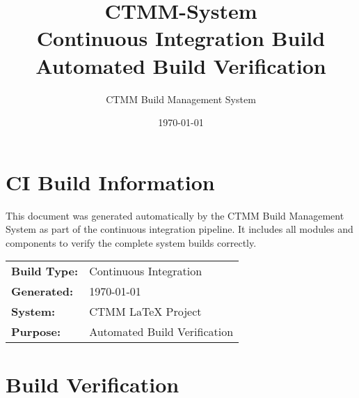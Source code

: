 \documentclass[a4paper,12pt]{article}
\begin{document}
\title{%
  {\Huge\textcolor{ctmmBlue}{CTMM-System}}\\
  \vspace{0.5cm}
  {\Large\textcolor{ctmmOrange}{Continuous Integration Build}}\\
  \vspace{0.3cm}
  {\normalsize Automated Build Verification}
}
\author{CTMM Build Management System}
\date{\today}
\maketitle

\tableofcontents
\newpage

\section{CI Build Information}
\label{sec:ci-info}

This document was generated automatically by the CTMM Build Management System as part of the continuous integration pipeline. It includes all modules and components to verify the complete system builds correctly.

\begin{center}
\begin{tabular}{ll}
\textbf{Build Type:} & Continuous Integration \\
\textbf{Generated:} & \today \\
\textbf{System:} & CTMM LaTeX Project \\
\textbf{Purpose:} & Automated Build Verification \\
\end{tabular}
\end{center}


















\section{Build Verification}
\label{sec:build-verification}
\end{document}
